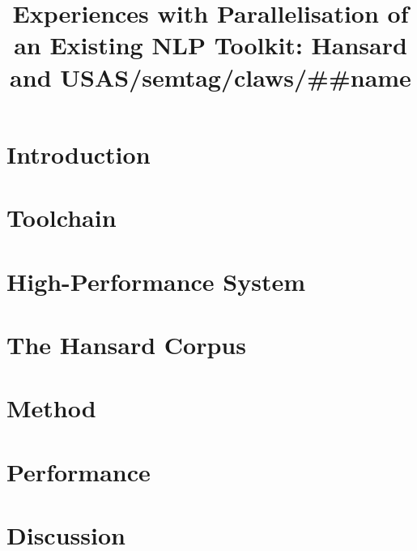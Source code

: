 \documentclass[10pt, a4paper]{article}
\title{Experiences with Parallelisation of an Existing NLP Toolkit: Hansard and USAS/semtag/claws/\#\#name}
\begin{document}
\maketitleabstract%

\section{Introduction}


\section{Toolchain}



\section{High-Performance System}



\section{The Hansard Corpus}



\section{Method}



\section{Performance}




\section{Discussion}









\end{document}
